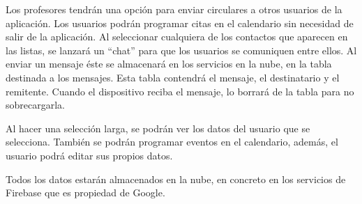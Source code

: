 		Los profesores tendrán una opción para enviar circulares a otros usuarios de la aplicación. Los usuarios podrán programar citas en el calendario sin necesidad de salir de la aplicación.
		Al seleccionar cualquiera de los contactos que aparecen en las listas, se lanzará un ``chat'' para que los usuarios se comuniquen entre ellos. Al enviar un mensaje éste se almacenará en los servicios en la nube, en la tabla destinada a los mensajes. Esta tabla contendrá el mensaje, el destinatario y el remitente. Cuando el dispositivo reciba el mensaje, lo borrará de la tabla para no sobrecargarla.
		
		\bigskip
		Al hacer una selección larga, se podrán ver los datos del usuario que se selecciona. También se podrán programar eventos en el calendario, además, el usuario podrá editar sus propios datos.
	
		Todos los datos estarán almacenados en la nube, en concreto en los servicios de Firebase\cite{6:firebase:online} que es propiedad de Google\cite{18:google:online}.

